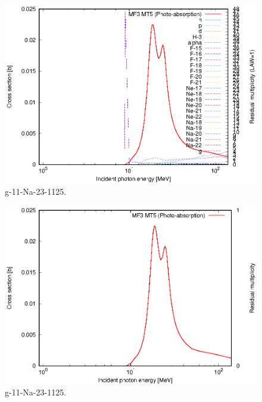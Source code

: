\begin{figure}
 \includegraphics[width=\linewidth]{eps/g_11-Na-23_1125.eps}
  \caption{g-11-Na-23-1125.}
\end{figure}
\begin{figure}
 \includegraphics[width=\linewidth]{eps-law0/g_11-Na-23_1125.eps}
 \caption{g-11-Na-23-1125.}
\end{figure}
\newpage \clearpage

